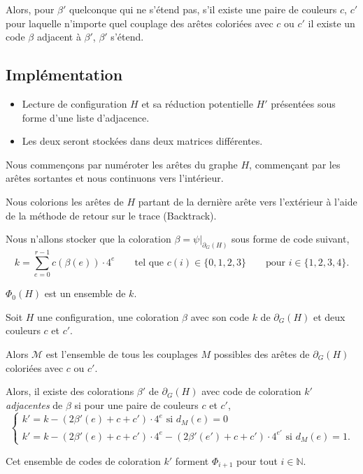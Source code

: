 \documentclass{beamer}
\begin{document}
\begin{frame}
Alors,
pour $\beta'$ quelconque qui ne s'étend pas,
s'il existe une paire de couleurs $c$, $c'$ pour laquelle n'importe quel couplage des arêtes coloriées avec $c$ ou $c'$ il existe un code $\beta$ adjacent à $\beta'$, $\beta'$ s'étend.
\end{frame}

\subsection{Implémentation}

\begin{frame}
\begin{itemize}
\item Lecture de configuration $H$ et sa réduction potentielle $H'$ présentées sous forme d'une liste d'adjacence.
\item Les deux seront stockées dans deux matrices différentes.
\end{itemize}
\end{frame}

\begin{frame}

Nous commençons par numéroter les arêtes du graphe $H$, commençant par les arêtes sortantes et nous continuons vers l'intérieur.

Nous colorions les arêtes de $H$ partant de la dernière arête vers l'extérieur à l'aide de la méthode de retour sur le trace (Backtrack).

Nous n'allons stocker que la coloration $\beta=\psi|_{\partial_G(H)}$ sous forme de code suivant,
$$
k = \sum_{e=0}^{r-1} c(\beta(e)) \cdot 4^{e} \qquad \textrm{tel que   } c(i) \in \{ 0,1,2,3 \} \qquad \textrm{pour  } i \in \{1,2,3,4 \}.
$$

$\Phi_0(H)$ est un ensemble de $k$.
\end{frame}

\begin{frame}

Soit $H$ une configuration, une coloration $\beta$ avec son code $k$ de $\partial_G(H)$ et deux couleurs $c$ et $c'$. 

Alors $\mathcal{M}$ est l'ensemble de tous les couplages $M$ possibles des arêtes de $\partial_G(H)$ coloriées avec $c$ ou $c'$.

\pause

Alors, il existe des colorations $\beta'$ de $\partial_G(H)$ avec code de coloration $k'$ \emph{adjacentes} de $\beta$ si pour une paire de couleurs $c$ et $c'$,
$$
\begin{cases}
k' =  k - (2\beta'(e)+c + c')\cdot 4^{e} \textrm{ si  }d_M(e)=0 \\
k' = k  - (2\beta'(e)+c + c')\cdot 4^{e} - (2\beta'(e')+c + c')\cdot 4^{e'} \textrm{ si  }d_M(e)=1.
\end{cases}
$$

Cet ensemble de codes de coloration $k'$ forment $\Phi_{i+1}$ pour tout $i\in \mathbb{N}$.
\end{frame}
\end{document}
